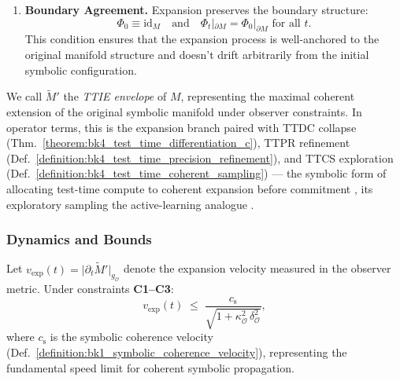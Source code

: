 \begin{definition}
\begin{enumerate}[label=\textbf{C\arabic*}]
\item \textbf{Boundary Agreement.} Expansion preserves the boundary structure:
\[
\Phi_0\equiv\mathrm{id}_M \quad \text{and} \quad
\Phi_t|_{\partial M}=\Phi_0|_{\partial M} \text{ for all } t.
\]
This condition ensures that the expansion process is well-anchored to the original manifold structure and doesn't drift arbitrarily from the initial symbolic configuration.
\end{enumerate}
We call $\widetilde{M}'$ the \emph{TTIE envelope} of $M$, representing the maximal coherent extension of the original symbolic manifold under observer constraints. In operator terms, this is the expansion branch paired with TTDC collapse (Thm.~\ref{theorem:bk4_test_time_differentiation_c}), TTPR refinement (Def.~\ref{definition:bk4_test_time_precision_refinement}), and TTCS exploration (Def.~\ref{definition:bk4_test_time_coherent_sampling}) --- the symbolic form of allocating test-time compute to coherent expansion before commitment \citep{snell2024scaling}, its exploratory sampling the active-learning analogue \citep{settles2009active}.
\end{definition}

\subsubsection{Dynamics and Bounds}
\begin{lemma}
\label{lemma:bk4_ttie_expansion_rate}
Let $v_{\text{exp}}(t)=\bigl|\partial_t\widetilde{M}'\bigr|_{g_{\mathcal{O}}}$ denote the expansion velocity measured in the observer metric. Under constraints \textbf{C1--C3}:
\[
v_{\text{exp}}(t)\;\le\;
\frac{c_{\text{s}}}{\sqrt{1+\kappa_{\mathcal{O}}^{2}\,\delta_{\mathcal{O}}^{2}}},
\]
where $c_{\text{s}}$ is the symbolic coherence velocity (Def.~\ref{definition:bk1_symbolic_coherence_velocity}), representing the fundamental speed limit for coherent symbolic propagation.
\end{lemma}

